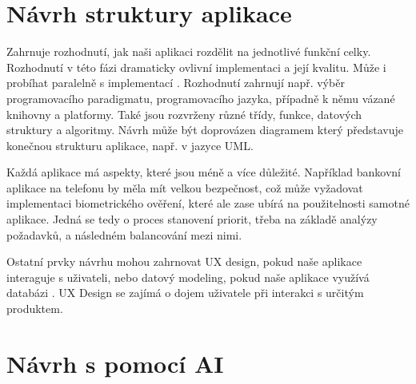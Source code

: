 \documentclass[FM,DP]{tulthesis}
\begin{document}
		\section{Návrh struktury aplikace}
		Zahrnuje rozhodnutí, jak naši aplikaci rozdělit na jednotlivé funkční celky. Rozhodnutí v této fázi dramaticky ovlivní implementaci a její kvalitu. Může i probíhat paralelně s implementací \cite{knuth1989notes} \cite{wikipedia:soft_design}. Rozhodnutí zahrnují např. výběr programovacího paradigmatu, programovacího jazyka, případně k němu vázané knihovny a platformy. Také jsou rozvrženy různé třídy, funkce, datových struktury a algoritmy. Návrh může být doprovázen diagramem který představuje konečnou strukturu aplikace, např. v jazyce UML.
		
		Každá aplikace má aspekty, které jsou méně a více důležité. Například bankovní aplikace na telefonu by měla mít velkou bezpečnost, což může vyžadovat implementaci biometrického ověření, které ale zase ubírá na použitelnosti samotné aplikace. Jedná se tedy o proces stanovení priorit, třeba na základě analýzy požadavků, a následném balancování mezi nimi.
		
		Ostatní prvky návrhu mohou zahrnovat UX design, pokud naše aplikace interaguje s uživateli, nebo datový modeling, pokud naše aplikace využívá databázi \cite{wikipedia:soft_design}. UX Design se zajímá o dojem uživatele při interakci s určitým produktem.
		
		\section{Návrh s pomocí AI}
\end{document}
